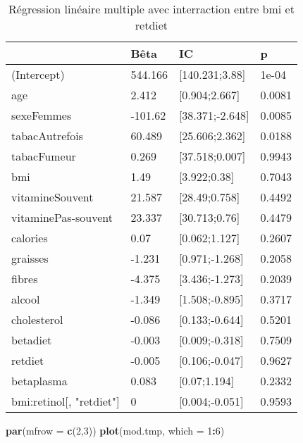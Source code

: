\documentclass[]{article}
\newenvironment{Shaded}{\begin{snugshade}}{\end{snugshade}}
\newcommand{\KeywordTok}[1]{\textcolor[rgb]{0.13,0.29,0.53}{\textbf{#1}}}
\newcommand{\DataTypeTok}[1]{\textcolor[rgb]{0.13,0.29,0.53}{#1}}
\newcommand{\DecValTok}[1]{\textcolor[rgb]{0.00,0.00,0.81}{#1}}
\newcommand{\OperatorTok}[1]{\textcolor[rgb]{0.81,0.36,0.00}{\textbf{#1}}}
\newcommand{\NormalTok}[1]{#1}
\begin{document}
\begin{table}

\caption{\label{tab:unnamed-chunk-72}Régression linéaire multiple avec interraction entre bmi et retdiet}
\centering
\begin{tabular}[t]{l|l|l|l}
\hline
  & Bêta & IC & p\\
\hline
\rowcolor[HTML]{BBD2E1}  (Intercept) & 544.166 & [140.231;3.88] & 1e-04\\
\hline
age & 2.412 & [0.904;2.667] & 0.0081\\
\hline
\rowcolor[HTML]{BBD2E1}  sexeFemmes & -101.62 & [38.371;-2.648] & 0.0085\\
\hline
tabacAutrefois & 60.489 & [25.606;2.362] & 0.0188\\
\hline
\rowcolor[HTML]{BBD2E1}  tabacFumeur & 0.269 & [37.518;0.007] & 0.9943\\
\hline
bmi & 1.49 & [3.922;0.38] & 0.7043\\
\hline
\rowcolor[HTML]{BBD2E1}  vitamineSouvent & 21.587 & [28.49;0.758] & 0.4492\\
\hline
vitaminePas-souvent & 23.337 & [30.713;0.76] & 0.4479\\
\hline
\rowcolor[HTML]{BBD2E1}  calories & 0.07 & [0.062;1.127] & 0.2607\\
\hline
graisses & -1.231 & [0.971;-1.268] & 0.2058\\
\hline
\rowcolor[HTML]{BBD2E1}  fibres & -4.375 & [3.436;-1.273] & 0.2039\\
\hline
alcool & -1.349 & [1.508;-0.895] & 0.3717\\
\hline
\rowcolor[HTML]{BBD2E1}  cholesterol & -0.086 & [0.133;-0.644] & 0.5201\\
\hline
betadiet & -0.003 & [0.009;-0.318] & 0.7509\\
\hline
\rowcolor[HTML]{BBD2E1}  retdiet & -0.005 & [0.106;-0.047] & 0.9627\\
\hline
betaplasma & 0.083 & [0.07;1.194] & 0.2332\\
\hline
\rowcolor[HTML]{BBD2E1}  bmi:retinol[, "retdiet"] & 0 & [0.004;-0.051] & 0.9593\\
\hline
\end{tabular}
\end{table}

\begin{Shaded}
\begin{Highlighting}[]
\KeywordTok{par}\NormalTok{(}\DataTypeTok{mfrow =} \KeywordTok{c}\NormalTok{(}\DecValTok{2}\NormalTok{,}\DecValTok{3}\NormalTok{))}
\KeywordTok{plot}\NormalTok{(mod.tmp, }\DataTypeTok{which =} \DecValTok{1}\OperatorTok{:}\DecValTok{6}\NormalTok{)}
\end{Highlighting}
\end{Shaded}
\end{document}
